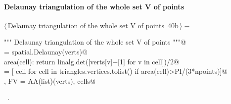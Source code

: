 \documentclass[11pt,oneside]{article}    %
\begin{document}
\paragraph{Delaunay triangulation of the whole set V of points}
\begin{flushleft} \small \label{scrap62}
\protect{}$\langle\,$Delaunay triangulation of the whole set V of points\nobreak\ {\footnotesize 40b}$\,\rangle\equiv$
\vspace{-1ex}
\begin{list}{}{} \item
\mbox{}\verb@""" Delaunay triangulation of the whole set V of points """@\\
\mbox{}\verb@triangles = spatial.Delaunay(verts)@\\
\mbox{}\verb@def area(cell): return linalg.det([verts[v]+[1] for v in cell])/2@\\
\mbox{}\verb@cells = [ cell for cell in triangles.vertices.tolist() if area(cell)>PI/(3*npoints)]@\\
\mbox{}\verb@V, FV = AA(list)(verts), cells@\\
\mbox{}\verb@@{\NWsep}
\end{list}
\vspace{-1ex}
\footnotesize\addtolength{\baselineskip}{-1ex}
\begin{list}{}{\setlength{\itemsep}{-\parsep}\setlength{\itemindent}{-\leftmargin}}
\item \NWtxtMacroRefIn\ .
\end{list}
\end{flushleft}
\end{document}
